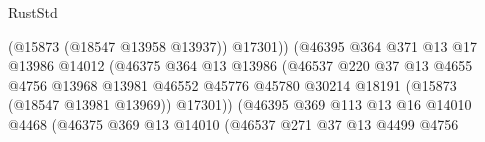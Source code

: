 \begin{lexlean}{RustStd}
\begin{coremodule}
                                                  (@15873 (@18547 @13958 @13937))
                                                  @17301))
                                              (@46395
                                                @364
                                                @371
                                                @13
                                                @17
                                                @13986
                                                @14012
                                                (@46375
                                                  @364
                                                  @13
                                                  @13986
                                                  (@46537
                                                    @220
                                                    @37
                                                    @13
                                                    @4655
                                                    @4756
                                                    @13968
                                                    @13981
                                                    @46552
                                                    @45776
                                                    @45780
                                                    @30214
                                                    @18191
                                                    (@15873 (@18547 @13981 @13969))
                                                    @17301))
                                                (@46395
                                                  @369
                                                  @113
                                                  @13
                                                  @16
                                                  @14010
                                                  @4468
                                                  (@46375
                                                    @369
                                                    @13
                                                    @14010
                                                    (@46537
                                                      @271
                                                      @37
                                                      @13
                                                      @4499
                                                      @4756

\end{coremodule}
\end{lexlean}

